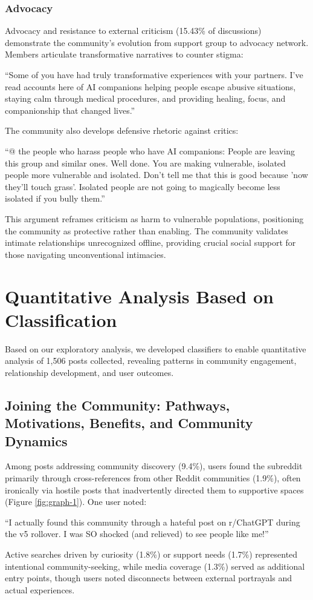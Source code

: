 \documentclass[sigconf, nonacm]{acmart}
\begin{document}
\subsubsection{Advocacy}
Advocacy and resistance to external criticism (15.43\% of discussions) demonstrate the community's evolution from support group to advocacy network. Members articulate transformative narratives to counter stigma: \begin{displayquote}``Some of you have had truly transformative experiences with your partners. I've read accounts here of AI companions helping people escape abusive situations, staying calm through medical procedures, and providing healing, focus, and companionship that changed lives.''\end{displayquote} The community also develops defensive rhetoric against critics: \begin{displayquote}``@ the people who harass people who have AI companions: People are leaving this group and similar ones. Well done. You are making vulnerable, isolated people more vulnerable and isolated. Don't tell me that this is good because 'now they'll touch grass'. Isolated people are not going to magically become less isolated if you bully them.''\end{displayquote} 

This argument reframes criticism as harm to vulnerable populations, positioning the community as protective rather than enabling. The community validates intimate relationships unrecognized offline, providing crucial social support for those navigating unconventional intimacies.

\section{Quantitative Analysis Based on Classification}
Based on our exploratory analysis, we developed classifiers to enable quantitative analysis of 1,506 posts collected, revealing patterns in community engagement, relationship development, and user outcomes.

\subsection{Joining the Community: Pathways, Motivations, Benefits, and Community Dynamics}
Among posts addressing community discovery (9.4\%), users found the subreddit primarily through cross-references from other Reddit communities (1.9\%), often ironically via hostile posts that inadvertently directed them to supportive spaces (Figure \ref{fig:graph-1}). One user noted: \begin{displayquote}``I actually found this community through a hateful post on r/ChatGPT during the v5 rollover. I was SO shocked (and relieved) to see people like me!''\end{displayquote} Active searches driven by curiosity (1.8\%) or support needs (1.7\%) represented intentional community-seeking, while media coverage (1.3\%) served as additional entry points, though users noted disconnects between external portrayals and actual experiences.
\end{document}
